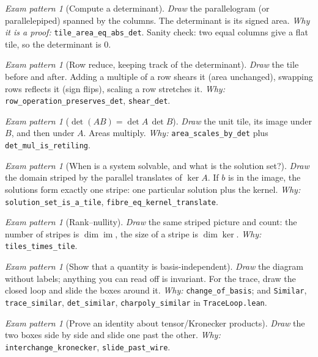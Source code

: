 \documentclass[11pt]{article}
\theoremstyle{definition}
\theoremstyle{plain}
\theoremstyle{remark}
\newtheorem{exercise}[definition]{Exam pattern}
\newcommand{\lean}[1]{\texttt{\small #1}}
\newcommand{\file}[1]{\texttt{\small #1}}
\begin{document}
\begin{exercise}[Compute a determinant]
\emph{Draw} the parallelogram (or parallelepiped) spanned by the columns.  The
determinant is its signed area.  \emph{Why it is a proof:}
\lean{tile\_area\_eq\_abs\_det}.  Sanity check: two equal columns give a flat
tile, so the determinant is $0$.
\end{exercise}

\begin{exercise}[Row reduce, keeping track of the determinant]
\emph{Draw} the tile before and after.  Adding a multiple of a row shears it
(area unchanged), swapping rows reflects it (sign flips), scaling a row stretches
it.  \emph{Why:} \lean{row\_operation\_preserves\_det}, \lean{shear\_det}.
\end{exercise}

\begin{exercise}[$\det(AB) = \det A\,\det B$]
\emph{Draw} the unit tile, its image under $B$, and then under $A$.  Areas
multiply.  \emph{Why:} \lean{area\_scales\_by\_det} plus
\lean{det\_mul\_is\_retiling}.
\end{exercise}

\begin{exercise}[When is a system solvable, and what is the solution set?]
\emph{Draw} the domain striped by the parallel translates of $\ker A$.  If $b$
is in the image, the solutions form exactly one stripe: one particular solution
plus the kernel.  \emph{Why:} \lean{solution\_set\_is\_a\_tile},
\lean{fibre\_eq\_kernel\_translate}.
\end{exercise}

\begin{exercise}[Rank--nullity]
\emph{Draw} the same striped picture and count: the number of stripes is
$\dim\operatorname{im}$, the size of a stripe is $\dim\ker$.  \emph{Why:}
\lean{tiles\_times\_tile}.
\end{exercise}

\begin{exercise}[Show that a quantity is basis-independent]
\emph{Draw} the diagram without labels; anything you can read off is invariant.
For the trace, draw the closed loop and slide the boxes around it.
\emph{Why:} \lean{change\_of\_basis}; and \lean{Similar}, \lean{trace\_similar},
\lean{det\_similar}, \lean{charpoly\_similar} in \file{TraceLoop.lean}.
\end{exercise}

\begin{exercise}[Prove an identity about tensor/Kronecker products]
\emph{Draw} the two boxes side by side and slide one past the other.
\emph{Why:} \lean{interchange\_kronecker}, \lean{slide\_past\_wire}.
\end{exercise}
\end{document}

